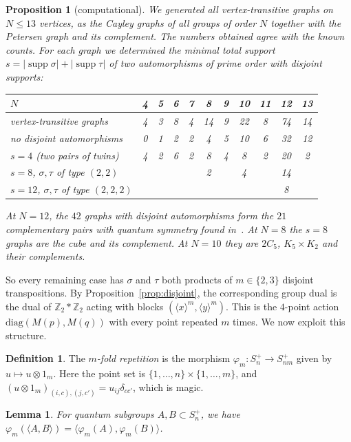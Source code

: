 \documentclass[11pt]{amsart}
\newtheorem{proposition}[theorem]{Proposition}
\newtheorem{lemma}[theorem]{Lemma}
\theoremstyle{definition}
\newtheorem{definition}[theorem]{Definition}
\theoremstyle{remark}
\theoremstyle{plain}
\numberwithin{equation}{section}
\numberwithin{table}{section}
\newcommand{\Z}{\mathbb Z}
\DeclareMathOperator{\supp}{supp}
\begin{document}
\begin{proposition}[computational]\label{prop:vtcount}
We generated all vertex-transitive graphs on $N\le13$ vertices, as the Cayley graphs of all groups of order $N$ together with the Petersen graph and its complement. The numbers obtained agree with the known counts. For each graph we determined the minimal total support $s=|\supp\sigma|+|\supp\tau|$ of two automorphisms of prime order with disjoint supports:
\begin{center}
\begin{tabular}{@{}lcccccccccc@{}}\toprule
$N$ & 4&5&6&7&8&9&10&11&12&13\\\midrule
vertex-transitive graphs & 4&3&8&4&14&9&22&8&74&14\\
no disjoint automorphisms & 0&1&2&2&4&5&10&6&32&12\\
$s=4$ (two pairs of twins) & 4&2&6&2&8&4&8&2&20&2\\
$s=8$, $\sigma,\tau$ of type $(2,2)$ & &&&&2&&4&&14&\\
$s=12$, $\sigma,\tau$ of type $(2,2,2)$ & &&&&&&&&8&\\\bottomrule
\end{tabular}
\end{center}
At $N=12$, the $42$ graphs with disjoint automorphisms form the $21$ complementary pairs with quantum symmetry found in~\cite{sz}. At $N=8$ the $s=8$ graphs are the cube and its complement. At $N=10$ they are $2C_5$, $K_5\times K_2$ and their complements.
\end{proposition}

So every remaining case has $\sigma$ and $\tau$ both products of $m\in\{2,3\}$ disjoint transpositions. By Proposition~\ref{prop:disjoint}, the corresponding group dual is the dual of $\Z_2*\Z_2$ acting with blocks $(\langle x\rangle^m,\langle y\rangle^m)$. This is the $4$-point action $\mathrm{diag}(M(p),M(q))$ with every point repeated $m$ times. We now exploit this structure.

\begin{definition}
The \emph{$m$-fold repetition} is the morphism $\varphi_m:S_n^+\to S_{nm}^+$ given by $u\mapsto u\otimes1_m$. Here the point set is $\{1,\dots,n\}\times\{1,\dots,m\}$, and $(u\otimes1_m)_{(i,c),(j,c')}=u_{ij}\delta_{cc'}$, which is magic.
\end{definition}

\begin{lemma}\label{lem:rep}
For quantum subgroups $A,B\subset S_n^+$, we have $\varphi_m(\langle A,B\rangle)=\langle\varphi_m(A),\varphi_m(B)\rangle$.
\end{lemma}
\end{document}
